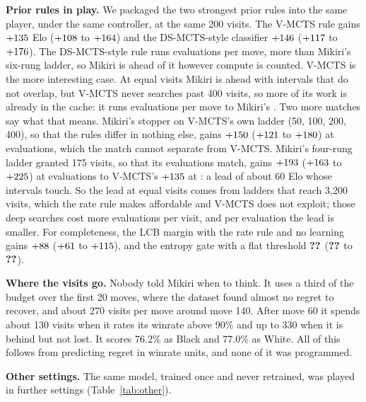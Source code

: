 \documentclass{article}
\begin{document}
\textbf{Prior rules in play.} We packaged the two strongest prior rules into the same player, under the same controller, at the same 200 visits. The V-MCTS rule gains $+135$ Elo ($+108$ to $+164$) and the DS-MCTS-style classifier $+146$ ($+117$ to $+176$). The DS-MCTS-style rule runs \dsmctsEvals{} evaluations per move, more than Mikiri's six-rung ladder, so Mikiri is ahead of it however compute is counted. V-MCTS is the more interesting case. At equal visits Mikiri is ahead with intervals that do not overlap, but V-MCTS never searches past 400 visits, so more of its work is already in the cache: it runs \vmctsEvals{} evaluations per move to Mikiri's \mainEvals. Two more matches say what that means. Mikiri's stopper on V-MCTS's own ladder (50, 100, 200, 400), so that the rules differ in nothing else, gains $+150$ ($+121$ to $+180$) at \shortEvals{} evaluations, which the match cannot separate from V-MCTS. Mikiri's four-rung ladder granted 175 visits, so that its evaluations match, gains $+193$ ($+163$ to $+225$) at \midEvals{} evaluations to V-MCTS's $+135$ at \vmctsEvals: a lead of about 60 Elo whose intervals touch. So the lead at equal visits comes from ladders that reach 3{,}200 visits, which the rate rule makes affordable and V-MCTS does not exploit; those deep searches cost more evaluations per visit, and per evaluation the lead is smaller. For completeness, the LCB margin with the rate rule and no learning gains $+88$ ($+61$ to $+115$), and the entropy gate with a flat threshold $\textbf{??}$ ($\textbf{??}$ to $\textbf{??}$).

\textbf{Where the visits go.} Nobody told Mikiri when to think. It uses a third of the budget over the first 20 moves, where the dataset found almost no regret to recover, and about 270 visits per move around move 140. After move 60 it spends about 130 visits when it rates its winrate above 90\% and up to 330 when it is behind but not lost. It scores 76.2\% as Black and 77.0\% as White. All of this follows from predicting regret in winrate units, and none of it was programmed.

\textbf{Other settings.} The same model, trained once and never retrained, was played in further settings (Table~\ref{tab:other}).

\begin{table}[t]
\centering\footnotesize
\setlength{\tabcolsep}{3pt}

\caption{The four-rung stopper, trained once on 19$\times$19 b18 positions, against KataGo at matched visits in other settings.}
\label{tab:other}
\end{table}
\end{document}
